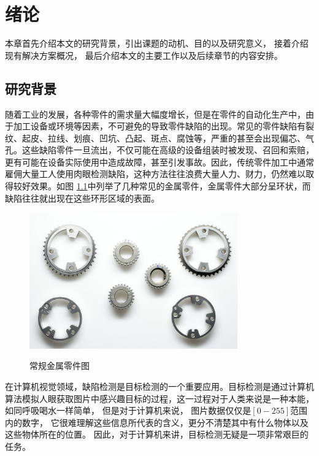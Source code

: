 \chapter{绪论}\label{chapter_introduction}

本章首先介绍本文的研究背景，引出课题的动机、目的以及研究意义，
接着介绍现有解决方案概况，
最后介绍本文的主要工作以及后续章节的内容安排。

\section{研究背景}

随着工业的发展，各种零件的需求量大幅度增长，但是在零件的自动化生产中，由于加工设备或环境等因素，不可避免的导致零件缺陷的出现。常见的零件缺陷有裂纹、起皮、拉线、划痕、凹坑、凸起、斑点、腐蚀等，严重的甚至会出现偏芯、气孔。这些缺陷零件一旦流出，不仅可能在高级的设备组装时被发现、召回和索赔，更有可能在设备实际使用中造成故障，甚至引发事故。因此，传统零件加工中通常雇佣大量工人使用肉眼检测缺陷，这种方法往往浪费大量人力、财力，仍然难以取得较好效果。如图
\ref{fig:changguilingjian}中列举了几种常见的金属零件，金属零件大部分呈环状，而缺陷往往就出现在这些环形区域的表面。
\begin{figure}[htbp]
\centering
\includegraphics[width=0.8\textwidth]{figures/changguilingjian.png}\\
\caption{常规金属零件图}\label{fig:changguilingjian}
\end{figure}

在计算机视觉领域，缺陷检测是目标检测的一个重要应用。目标检测是通过计算机算法模拟人眼获取图片中感兴趣目标的过程，这一过程对于人类来说是一种本能，如同呼吸喝水一样简单，
但是对于计算机来说，
图片数据仅仅是$[0-255]$范围内的数字，
它很难理解这些信息所代表的含义，更分不清楚其中有什么物体以及这些物体所在的位置。
因此，对于计算机来讲，目标检测无疑是一项非常艰巨的任务。

